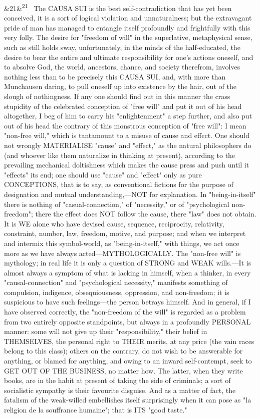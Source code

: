 \documentclass[12pt]{article}
\newcommand{\para}[1][]{\par\noindent\ifx&#1&\else\textsuperscript{\footnotesize #1}~\fi}
\begin{document}
\para[21] The CAUSA SUI is the best self-contradiction that has yet been conceived, it is a sort of logical violation and unnaturalness; but the extravagant pride of man has managed to entangle itself profoundly and frightfully with this very folly. The desire for "freedom of will" in the superlative, metaphysical sense, such as still holds sway, unfortunately, in the minds of the half-educated, the desire to bear the entire and ultimate responsibility for one's actions oneself, and to absolve God, the world, ancestors, chance, and society therefrom, involves nothing less than to be precisely this CAUSA SUI, and, with more than Munchausen daring, to pull oneself up into existence by the hair, out of the slough of nothingness. If any one should find out in this manner the crass stupidity of the celebrated conception of "free will" and put it out of his head altogether, I beg of him to carry his "enlightenment" a step further, and also put out of his head the contrary of this monstrous conception of "free will": I mean "non-free will," which is tantamount to a misuse of cause and effect. One should not wrongly MATERIALISE "cause" and "effect," as the natural philosophers do (and whoever like them naturalize in thinking at present), according to the prevailing mechanical doltishness which makes the cause press and push until it "effects" its end; one should use "cause" and "effect" only as pure CONCEPTIONS, that is to say, as conventional fictions for the purpose of designation and mutual understanding,---NOT for explanation. In "being-in-itself" there is nothing of "casual-connection," of "necessity," or of "psychological non-freedom"; there the effect does NOT follow the cause, there "law" does not obtain. It is WE alone who have devised cause, sequence, reciprocity, relativity, constraint, number, law, freedom, motive, and purpose; and when we interpret and intermix this symbol-world, as "being-in-itself," with things, we act once more as we have always acted---MYTHOLOGICALLY. The "non-free will" is mythology; in real life it is only a question of STRONG and WEAK wills.---It is almost always a symptom of what is lacking in himself, when a thinker, in every "causal-connection" and "psychological necessity," manifests something of compulsion, indigence, obsequiousness, oppression, and non-freedom; it is suspicious to have such feelings---the person betrays himself. And in general, if I have observed correctly, the "non-freedom of the will" is regarded as a problem from two entirely opposite standpoints, but always in a profoundly PERSONAL manner: some will not give up their "responsibility," their belief in THEMSELVES, the personal right to THEIR merits, at any price (the vain races belong to this class); others on the contrary, do not wish to be answerable for anything, or blamed for anything, and owing to an inward self-contempt, seek to GET OUT OF THE BUSINESS, no matter how. The latter, when they write books, are in the habit at present of taking the side of criminals; a sort of socialistic sympathy is their favourite disguise. And as a matter of fact, the fatalism of the weak-willed embellishes itself surprisingly when it can pose as "la religion de la souffrance humaine"; that is ITS "good taste."
\end{document}
